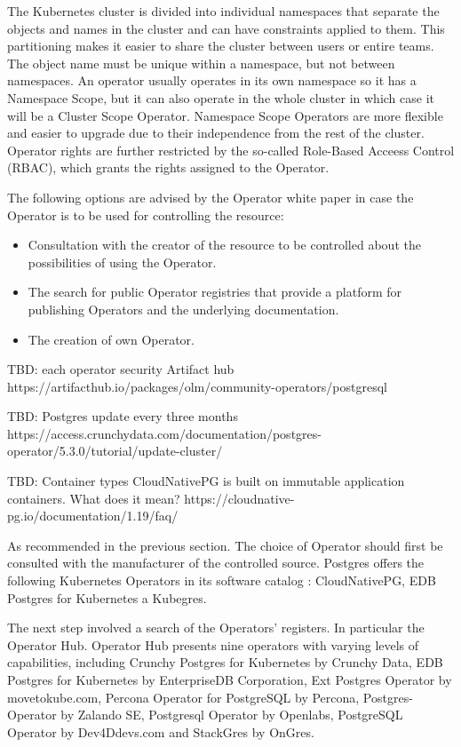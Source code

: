 The Kubernetes cluster is divided into individual namespaces that separate the objects and names in the cluster and can have constraints applied to them. This partitioning makes it easier to share the cluster between users or entire teams. The object name must be unique within a namespace, but not between namespaces.  An operator usually operates in its own namespace so it has a Namespace Scope, but it can also operate in the whole cluster in which case it will be a Cluster Scope Operator. Namespace Scope Operators are more flexible and easier to upgrade due to their independence from the rest of the cluster. Operator rights are further restricted by the so-called Role-Based Acceess Control (RBAC), which grants the rights assigned to the Operator. \cite{ OperatorsAtK8sIface}

The following options are advised by the Operator white paper \cite{OperatorWhitepaper} in case the Operator is to be used for controlling the resource:
\begin{itemize}
  \item	Consultation with the creator of the resource to be controlled about the possibilities of using the Operator.
  \item	The search for public Operator registries that provide a platform for publishing Operators and the underlying documentation.
  \item	The creation of own Operator.
\end{itemize}


TBD: each operator security Artifact hub https://artifacthub.io/packages/olm/community-operators/postgresql

TBD: Postgres update every three months https://access.crunchydata.com/documentation/postgres-operator/5.3.0/tutorial/update-cluster/

TBD: Container types CloudNativePG is built on immutable application containers. What does it mean? https://cloudnative-pg.io/documentation/1.19/faq/

As recommended in the previous section. The choice of Operator should first be consulted with the manufacturer of the controlled source. Postgres offers the following Kubernetes Operators in its software catalog \cite{docuPgSwCatalogue}: CloudNativePG, EDB Postgres for Kubernetes a Kubegres.

The next step involved a search of the Operators' registers. In particular the Operator Hub. \cite{OperatorHubPGSearch} Operator Hub presents nine operators with varying levels of capabilities, including Crunchy Postgres for Kubernetes by Crunchy Data, EDB Postgres for Kubernetes by EnterpriseDB Corporation, Ext Postgres Operator by movetokube.com, Percona Operator for PostgreSQL by Percona, Postgres-Operator by Zalando SE, Postgresql Operator by Openlabs, PostgreSQL Operator by Dev4Ddevs.com and StackGres by OnGres.

